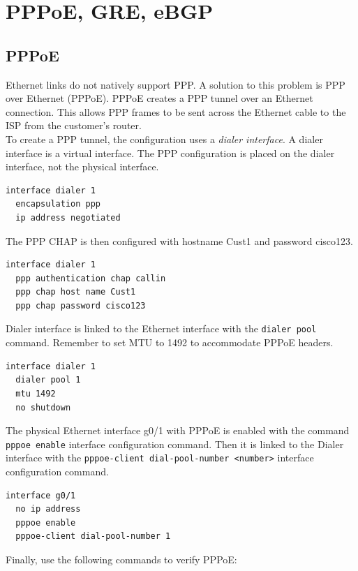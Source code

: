 \chapter{PPPoE, GRE, eBGP}

\section{PPPoE}

Ethernet links do not natively support PPP. A solution to this problem is PPP over Ethernet (PPPoE). PPPoE creates a PPP tunnel over an Ethernet connection. This allows PPP frames to be sent across the Ethernet cable to the ISP from the customer’s router.\\

To create a PPP tunnel, the configuration uses a \emph{dialer interface}. A dialer interface is a virtual interface. The PPP configuration is placed on the dialer interface, not the physical interface. 

\begin{verbatim}
interface dialer 1
  encapsulation ppp
  ip address negotiated
\end{verbatim}

The PPP CHAP is then configured with hostname Cust1 and password cisco123.
 
\begin{verbatim}
interface dialer 1
  ppp authentication chap callin
  ppp chap host name Cust1
  ppp chap password cisco123
\end{verbatim}

Dialer interface is linked to the Ethernet interface with the \verb|dialer pool| command. Remember to set MTU to 1492 to accommodate PPPoE headers.

\begin{verbatim}
interface dialer 1
  dialer pool 1
  mtu 1492
  no shutdown
\end{verbatim}

The physical Ethernet interface g0/1 with PPPoE is enabled with the command \verb|pppoe enable| interface configuration command. Then it is linked to the Dialer interface with the \verb|pppoe-client dial-pool-number <number>| interface configuration command.

\begin{verbatim}
interface g0/1
  no ip address
  pppoe enable
  pppoe-client dial-pool-number 1
\end{verbatim}

Finally, use the following commands to verify PPPoE:

